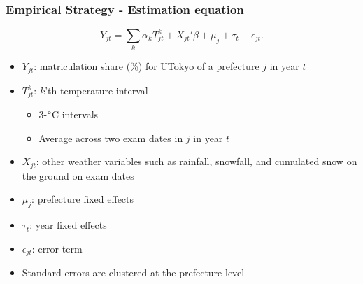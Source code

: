 \documentclass[10pt, pdfmx,hiresbb]{beamer}
\begin{document}
\begin{frame}\frametitle{Empirical Strategy - Estimation equation}
  \label{est_eq}
  \begin{equation*}
    Y_{jt} = \sum_k \alpha_k T_{jt}^k + X_{jt}' \beta + \mu_j + \tau_t + \epsilon_{jt}.
  \end{equation*}
  \begin{itemize}
    \item $Y_{jt}$: matriculation share (\%) for UTokyo of a prefecture $j$ in year $t$
    \item $T_{jt}^k$: $k$'th temperature interval 
      \begin{itemize}
        \item 3-$\degree$C intervals
        \item Average across two exam dates in $j$ in year $t$
      \end{itemize}
    \item $X_{jt}$: other weather variables such as rainfall, snowfall, and cumulated snow on the ground on exam dates
    \item $\mu_j$: prefecture fixed effects
    \item $\tau_t$: year fixed effects
    \item $\epsilon_{jt}$: error term
    \item Standard errors are clustered at the prefecture level 
  \end{itemize}
  \hyperlink{temp_dev_1}{}
  \hyperlink{temp_dev_2}{}
\end{frame}
\end{document}
